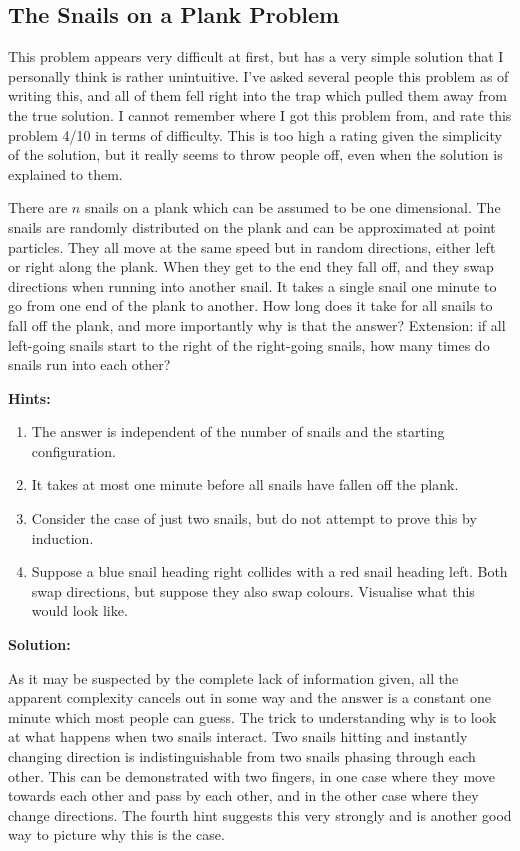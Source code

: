 \subsection{The Snails on a Plank Problem}

This problem appears very difficult at first, but has a very simple solution that I personally think is rather unintuitive. I've asked several people this problem as of writing this, and all of them fell right into the trap which pulled them away from the true solution. I cannot remember where I got this problem from, and rate this problem 4/10 in terms of difficulty. This is too high a rating given the simplicity of the solution, but it really seems to throw people off, even when the solution is explained to them.

There are $n$ snails on a plank which can be assumed to be one dimensional. The snails are randomly distributed on the plank and can be approximated at point particles. They all move at the same speed but in random directions, either left or right along the plank. When they get to the end they fall off, and they swap directions when running into another snail. It takes a single snail one minute to go from one end of the plank to another. How long does it take for all snails to fall off the plank, and more importantly why is that the answer? Extension: if all left-going snails start to the right of the right-going snails, how many times do snails run into each other?

\textbf{Hints:}

\begin{enumerate}
	\item The answer is independent of the number of snails and the starting configuration.
	\item It takes at most one minute before all snails have fallen off the plank.
	\item Consider the case of just two snails, but do not attempt to prove this by induction.
	\item Suppose a blue snail heading right collides with a red snail heading left. Both swap directions, but suppose they also swap colours. Visualise what this would look like.
\end{enumerate}

\textbf{Solution:}

As it may be suspected by the complete lack of information given, all the apparent complexity cancels out in some way and the answer is a constant one minute which most people can guess. The trick to understanding why is to look at what happens when two snails interact. Two snails hitting and instantly changing direction is indistinguishable from two snails phasing through each other. This can be demonstrated with two fingers, in one case where they move towards each other and pass by each other, and in the other case where they change directions. The fourth hint suggests this very strongly and is another good way to picture why this is the case.

